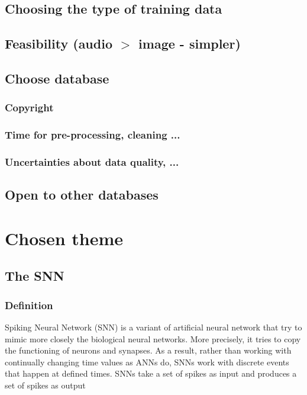 \documentclass[11pt]{article}
\begin{document}
\subsection{Choosing the type of training data}
\subsection{Feasibility (audio $>$ image - simpler)}
\subsection{Choose database}
\subsubsection{Copyright}
\subsubsection{Time for pre-processing, cleaning ...}
\subsubsection{Uncertainties about data quality, ...}
\subsection{Open to other databases}

\section{Chosen theme}
\subsection{The SNN}
\subsubsection{Definition}
Spiking Neural Network (SNN) is a variant of artificial neural network that try to mimic more closely the biological neural networks. More precisely, it tries to copy the functioning of neurons and synapses. As a result, rather than working with continually changing time values as ANNs do, SNNs work with discrete events that happen at defined times. SNNs take a set of spikes as input and produces a set of spikes as output
\end{document}
